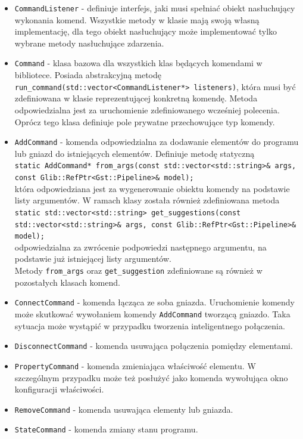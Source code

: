 \documentclass[12pt]{article}
\begin{document}
\begin{itemize}
 \setlength{\itemsep}{0em}
\item \texttt{CommandListener} - definiuje interfejs, jaki musi spełniać obiekt nasłuchujący wykonania komend. Wszystkie metody w klasie mają swoją własną implementację, dla tego obiekt nasłuchujący może implementować tylko wybrane metody nasłuchujące zdarzenia.
\item \texttt{Command} - klasa bazowa dla wszystkich klas będących komendami w bibliotece. Posiada abstrakcyjną metodę \texttt{run\_command(std::vector<CommandListener*> listeners)}, która musi być zdefiniowana w klasie reprezentującej konkretną komendę. Metoda odpowiedzialna jest za uruchomienie zdefiniowanego wcześniej polecenia. Oprócz tego klasa definiuje pole prywatne przechowujące typ komendy.
\item \texttt{AddCommand} - komenda odpowiedzialna za dodawanie elementów do programu lub gniazd do istniejących elementów. Definiuje metodę statyczną \\
\texttt{static AddCommand* from\_args(const std::vector<std::string>\& args, const Glib::RefPtr<Gst::Pipeline>\& model);}\\
która odpowiedziana jest za wygenerowanie obiektu komendy na podstawie listy argumentów.
W ramach klasy została również zdefiniowana metoda \\
\texttt{static std::vector<std::string> get\_suggestions(const std::vector<std::string>\& args, const Glib::RefPtr<Gst::Pipeline>\& model);}\\
odpowiedzialna za zwrócenie podpowiedzi następnego argumentu, na podstawie już istniejącej listy argumentów.\\
Metody \texttt{from\_args} oraz \texttt{get\_suggestion} zdefiniowane są również w pozostałych klasach komend.
\item \texttt{ConnectCommand} - komenda łącząca ze soba gniazda. Uruchomienie komendy może skutkować wywołaniem komendy \texttt{AddCommand} tworzącą gniazdo. Taka sytuacja może wystąpić w przypadku tworzenia inteligentnego połączenia.
\item \texttt{DisconnectCommand} - komenda usuwająca połączenia pomiędzy elementami.
\item \texttt{PropertyCommand} - komenda zmieniająca właściwość elementu. W szczególnym przypadku może też posłużyć jako komenda wywołująca okno konfiguracji właściwości.
\item \texttt{RemoveCommand} - komenda usuwająca elementy lub gniazda.
\item \texttt{StateCommand} - komenda zmiany stanu programu.
\end{itemize}
\end{document}
